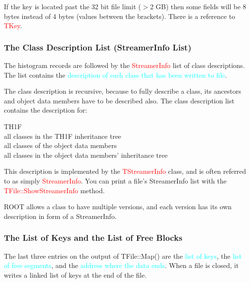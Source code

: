 \documentclass[12pt,a4paper]{article}
\begin{document}
If the key is located past the 32 bit file limit ($> 2$ GB) then some fields will be 8 bytes instead of 4 bytes (values between the brackets). There is a reference to \textcolor{red}{TKey}.

\subsubsection{The Class Description List (StreamerInfo List)}
The histogram records are followed by the \textcolor{red}{StreamerInfo} list of class descriptions. The list contains the \textcolor{cyan}{description of each class that has been written to file}.

The class description is recursive, because to fully describe a class, its ancestors and object data members have to be described also. The class description list contains the description for:

TH1F \\
all classes in the TH1F inheritance tree \\
all classes of the object data members \\
all classes in the object data members' inheritance tree 

This description is implemented by the \textcolor{red}{TStreamerInfo} class, and is often referred to as simply \textcolor{red}{StreamerInfo}. You can print a file’s StreamerInfo list with the \textcolor{red}{TFile::ShowStreamerInfo} method. 

ROOT allows a class to have multiple versions, and each version has its own description in form of a StreamerInfo. 

\subsubsection{The List of Keys and the List of Free Blocks}
The last three entries on the output of TFile::Map() are the \textcolor{cyan}{list of keys}, the \textcolor{cyan}{list of free segments}, and the \textcolor{cyan}{address where the data ends}. When a file is closed, it writes a linked list of keys at the end of the file.
\end{document}
